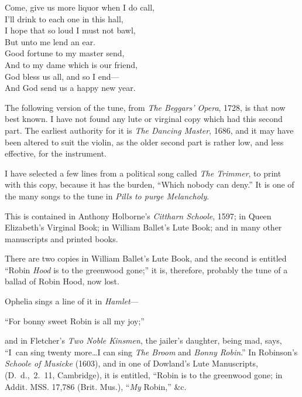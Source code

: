 \begin{dcverse}
\begin{patverse}
Come, give us more liquor when I do call,\\
I’ll drink to each one in this hall,\\
I hope that so loud I must not bawl,\\
But unto me lend an ear.\\
Good fortune to my master send,\\
And to my dame which is our friend,\\
God bless us all, and so I end—\\
And God send us a happy new year.
\end{patverse}
\end{dcverse}

The following version of the tune, from \textit{The Beggars' Opera}, 1728, is that
now best known. I have not found any lute or virginal copy which had this
second part. The earliest authority for it is \textit{The Dancing Master}, 1686, and it
may have been altered to suit the violin, as the older second part is rather low,
and less effective, for the instrument.
\pagebreak

I have selected a few lines from a political song called \textit{The Trimmer}, to print
with this copy, because it has the burden, “Which nobody can deny.” It is one
of the many songs to the tune in \textit{Pills to purge Melancholy}.


\medskip



This is contained in Anthony Holborne’s \textit{Cittharn Schoole}, 1597; in Queen
Elizabeth’s Virginal Book; in William Ballet’s Lute Book; and in many other
manuscripts and printed books.

There are two copies in William Ballet’s Lute Book, and the second is entitled
“Robin \textit{Hood} is to the greenwood gone;” it is, therefore, probably the tune of a
ballad of Robin Hood, now lost.

Ophelia sings a line of it in \textit{Hamlet}—
\settowidth{\versewidth}{“For bonny sweet Robin is all my joy;”}
\begin{scverse}
“For bonny sweet Robin is all my joy;”
\end{scverse}
and in Fletcher’s \textit{Two Noble Kinsmen}, the jailer’s daughter, being mad, says,
“I~can sing twenty more\dots I can sing \textit{The Broom} and \textit{Bonny Robin}.” In
Robinson’s \textit{Schoole of Musicke} (1603), \pagebreak and in one of Dowland’s Lute Manuscripts,
(D.~d.,~2.~11, Cambridge), it is entitled, “Robin is to the greenwood gone; in
Addit. MSS. 17,786 (Brit. Mus.), “\textit{My} Robin,” \&c.

